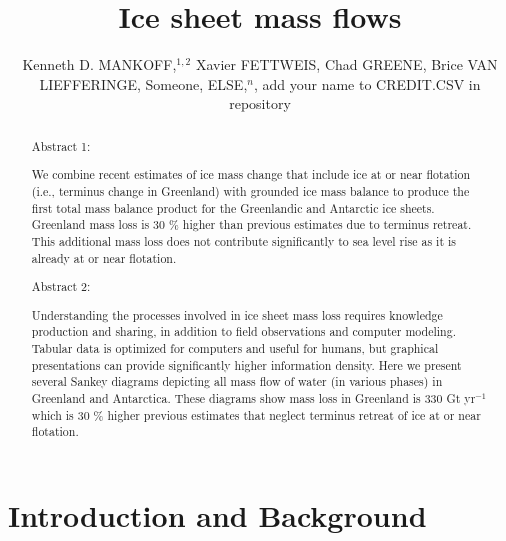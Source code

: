 \documentclass[jog]{igs}
\begin{document}
\title[Sankey mass flows]{Ice sheet mass flows}

\author[Mankoff and others]
       {Kenneth D. MANKOFF,$^{1,2}$
         Xavier FETTWEIS,
         Chad GREENE,
         Brice VAN LIEFFERINGE,
         Someone, ELSE,$^n$,
       add your name to CREDIT.CSV in repository}


\begin{frontmatter}
\maketitle
\begin{abstract}

  Abstract 1:
  
  We combine recent estimates of ice mass change that include ice at or near flotation (i.e., terminus change in Greenland) with grounded ice mass balance to produce the first total mass balance product for the Greenlandic and Antarctic ice sheets. Greenland mass loss is 30 \% higher than previous estimates due to terminus retreat. This additional mass loss does not contribute significantly to sea level rise as it is already at or near flotation.

  Abstract 2:

  Understanding the processes involved in ice sheet mass loss requires knowledge production and sharing, in addition to field observations and computer modeling. Tabular data is optimized for computers and useful for humans, but graphical presentations can provide significantly higher information density. Here we present several Sankey diagrams depicting all mass flow of water (in various phases) in Greenland and Antarctica. These diagrams show mass loss in Greenland is 330 Gt yr$^{-1}$  which is 30 \% higher previous estimates that neglect terminus retreat of ice at or near flotation.

\end{abstract}
\end{frontmatter}

\section{Introduction and Background}
\end{document}
